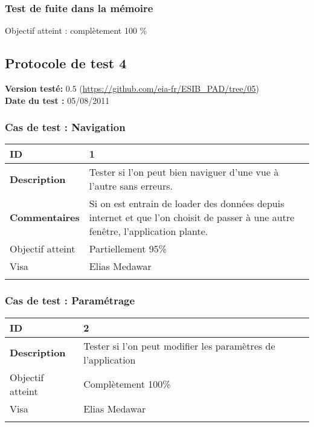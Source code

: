 		 		 \subsubsection*{Test de fuite dans la mémoire}
		 		 Objectif atteint : {\color{green}complètement 100 \% \CheckedBox}\\
	
	
	
		\subsection{Protocole de test 4}
		 		\textbf{Version testé:} 0.5 (\url{https://github.com/eia-fr/ESIB_PAD/tree/05}) \\
		 		\textbf{	Date du test :} 05/08/2011
		 
		 		\subsubsection*{Cas de test : Navigation}
		 				 \begin{longtable}{m{4cm}|p{10cm}|}
		 				 \textbf{ ID} & 1 \\
		 				 \hline \textbf{Description} & Tester si l'on peut bien naviguer d'une vue à l'autre sans erreurs.\\
		 				 \hline \textbf{Commentaires} & Si on est entrain de loader des données depuis internet et que l'on choisit de passer à une autre fenêtre, l'application plante. \\
		 				 \hline Objectif  atteint & {\color{orange} Partiellement 95\% \CheckedBox } \\
		 				\hline Visa & Elias Medawar \\	
		 				 \\
		 			 \end{longtable} 
		  		\subsubsection*{Cas de test : Paramétrage}
		 		 \begin{longtable}{m{4cm}|p{10cm}|}
		 		 \textbf{ ID} & 2 \\
		 		 \hline \textbf{Description} & Tester si l'on peut modifier les paramètres de l'application\\
		  				\hline Objectif atteint &  {\color{green}Complètement 100\% \CheckedBox} \\
		  				\hline Visa & Elias Medawar 	\\
		 		 \\
		 		  \end{longtable} 		 		 
